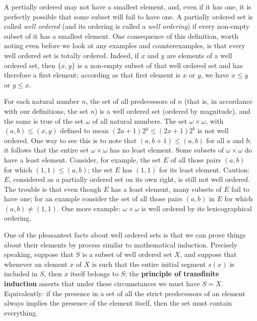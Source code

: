
A pertially ordered may not have a smallest element, and, even if it has one, it is perfectly possible that some subset will fail to have one. A partially ordered set is called \textit{well ordered} (and its ordering is called a \textit{well ordering}) if every non-empty subset of it has a smallest element. One consequence of this definition, worth noting even before we look at any examples and counterexamples, is that every well ordered set is totally ordered. Indeed, if $x$ and $y$ are elements of a well ordered set, then $\{ x,y \}$ is a non-empty subset of that well ordered set and has therefore a first element; according as that first element is $x$ or $y$, we have $x \le y$ or $y \le x$.

For each natural number $n$, the set of all predecessors of $n$ (that is, in accordance with our definitions, the set $n$) is a well ordered set (ordered by magnitude), and the same is true of the set $\omega$ of all natural numbers. The set $\omega \times \omega $, with $(a,b) \le (x,y)$ defined to mean $(2a + 1)2^{y} \le (2x + 1)2^{b}$ is not well ordered. One way to see this is to note that $(a,b + 1) \le (a,b)$ for all $a$ and $b$; it follows that the entire set $\omega \times \omega$ has no least element. Some subsets of $\omega \times \omega$ do have a least element. Consider, for example, the set $E$ of all those pairs $(a, b)$ for which $(1,1) \le (a,b)$; the set $E$ has $(1, 1)$ for its least element. Caution: $E$, considered as a partially ordered set on its own right, is still not well ordered. The trouble is that even though $E$ has a least element, many subsets of $E$ fail to have one; for an example consider the set of all those pairs $(a,b)$ in $E$ for which $(a,b) \neq (1, 1)$. One more example: $\omega \times \omega$ is well ordered by its lexicographical ordering. 

One of the pleasantest facts about well ordered sets is that we can prove things about their elements by process similar to mathematical induction. Precisely speaking, suppose that $S$ is a subset of well ordered set $X$, and suppose that whenever an element $x$ of $X$ is such that the entire initial segment $s(x)$ is included in $S$, then $x$ itself belongs to $S$; the \textbf{principle of transfinite induction} asserts that under these circumstances we must have $S = X$. Equivalently: if the presence in a set of all the strict predecessors of an element always implies the presence of the element itself, then the set must contain everything. 

